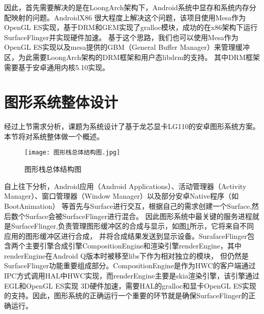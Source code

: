 因此，首先需要解决的是在LoongArch架构下，Android系统中显存和系统内存分配映射的问题。AndroidX86\cite{AndroidX86}
很大程度上解决这个问题，该项目使用Mesa作为OpenGL ES实现，基于DRM和GEM实现了gralloc模块，成功的在x86架构下运行SurfaceFlinger并实现硬件加速\cite{XTYY201710015}。
基于这个思路，我们也可以使用Mesa作为OpenGL ES实现以及mesa提供的GBM（General Buffer Manager）来管理缓冲区，为此需要LoongArch架构的DRM框架和用户态libdrm的支持。
其中DRM框架需要基于安卓通用内核5.10实现。

\section{图形系统整体设计}
经过上节需求分析，课题为系统设计了基于龙芯显卡LG110的安卓图形系统方案。本节将对系统整体做一个概述。

\begin{figure}[h]
  \centering
  \texttt{[image: 图形栈总体结构图.jpg]}
  \caption{图形栈总体结构图}    
  \label{fig:图形栈总体结构图}
\end{figure}

自上往下分析，Android应用（Android Applications）、活动管理器（Activity Manager）、窗口管理器（Window Manager）以及部分安卓Native程序（如BootAnimation）
等首先与Surface进行交互，根据自己的需求创建一个Surface,然后数个Surface会被SurfaceFlinger进行混合\cite{邓凡平2011深入理解}。
因此图形系统中最关键的服务进程就是SurfaceFlinger,负责管理图形缓冲区的合成与显示，如图\ref{fig:图形栈总体结构图}所示，它将来自不同应用的图形缓冲区进行合成，
并将合成结果发送到显示设备。SurafaceFlinger包含两个主要引擎合成引擎CompositionEngine和渲染引擎renderEngine，其中renderEngine在Android Q版本时被移至libs下作为相对独立的模块，
但仍然是SurfaceFlinger功能重要组成部分。CompositionEngine是作为HWC的客户端通过IPC方式调用HAL中HWC实现，而renderEngine主要是skia渲染引擎，该引擎通过EGL和OpenGL ES实现
3D硬件加速，需要HAL的gralloc和显卡OpenGL ES实现的支持。因此，图形系统的正确运行一个重要的环节就是确保SurfaceFlinger的正确运行。

